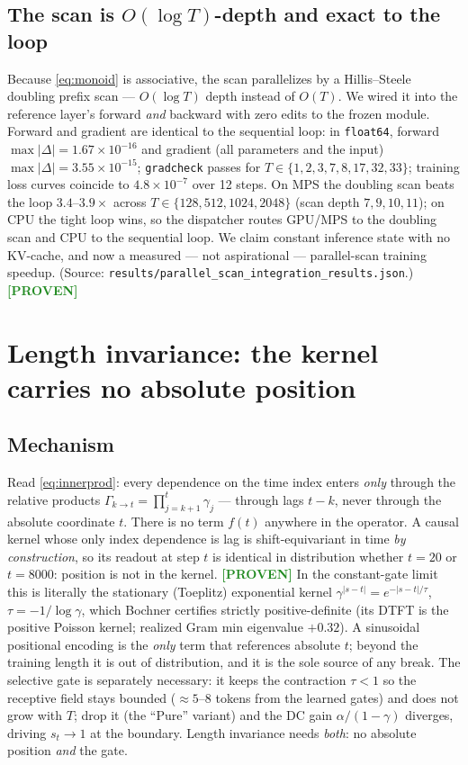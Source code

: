 \documentclass[11pt]{article}
\theoremstyle{definition}
\newcommand{\Gk}{\Gamma_{k\to t}}
\newcommand{\code}[1]{\texttt{#1}}
\newcommand{\PROVEN}{\textcolor{ForestGreen}{\textbf{[PROVEN]}}}
\begin{document}
\subsection{The scan is $O(\log T)$-depth and exact to the loop}
Because \eqref{eq:monoid} is associative, the scan parallelizes by a Hillis--Steele doubling
prefix scan --- $O(\log T)$ depth instead of $O(T)$. We wired it into the reference layer's
forward \emph{and} backward with zero edits to the frozen module. Forward and gradient are
identical to the sequential loop: in \code{float64}, forward $\max|\Delta|=1.67\times10^{-16}$
and gradient (all parameters and the input) $\max|\Delta|=3.55\times10^{-15}$;
\code{gradcheck} passes for $T\in\{1,2,3,7,8,17,32,33\}$; training loss curves coincide to
$4.8\times10^{-7}$ over 12 steps. On MPS the doubling scan beats the loop $3.4$--$3.9\times$
across $T\in\{128,512,1024,2048\}$ (scan depth $7,9,10,11$); on CPU the tight loop wins, so
the dispatcher routes GPU/MPS to the doubling scan and CPU to the sequential loop. We claim
constant inference state with no KV-cache, and now a measured --- not aspirational ---
parallel-scan training speedup. (Source:
\code{results/parallel\_scan\_integration\_results.json}.) \PROVEN

\section{Length invariance: the kernel carries no absolute position}
\label{sec:length}

\subsection{Mechanism}
Read \eqref{eq:innerprod}: every dependence on the time index enters \emph{only} through the
relative products $\Gk=\prod_{j=k+1}^t\gamma_j$ --- through lags $t-k$, never through the
absolute coordinate $t$. There is no term $f(t)$ anywhere in the operator. A causal kernel
whose only index dependence is lag is shift-equivariant in time \emph{by construction}, so its
readout at step $t$ is identical in distribution whether $t=20$ or $t=8000$: position is not
in the kernel. \PROVEN{} In the constant-gate limit this is literally the stationary
(Toeplitz) exponential kernel $\gamma^{|s-t|}=e^{-|s-t|/\tau}$, $\tau=-1/\log\gamma$, which
Bochner certifies strictly positive-definite (its DTFT is the positive Poisson kernel; realized
Gram min eigenvalue $+0.32$). A sinusoidal positional encoding is the \emph{only} term that
references absolute $t$; beyond the training length it is out of distribution, and it is the
sole source of any break. The selective gate is separately necessary: it keeps the contraction
$\tau<1$ so the receptive field stays bounded ($\approx5$--$8$ tokens from the learned gates)
and does not grow with $T$; drop it (the ``Pure'' variant) and the DC gain $\alpha/(1-\gamma)$
diverges, driving $s_t\to 1$ at the boundary. Length invariance needs \emph{both}: no absolute
position \emph{and} the gate.
\end{document}
